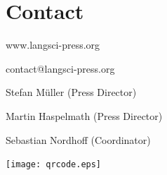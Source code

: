 \documentclass[
notumble,
]{leaflet}
\begin{document}
\section{\sffamily\Large Contact}
\parbox{.7\textwidth}{
{  \sffamily www.langsci-press.org}

{  \sffamily  contact@langsci-press.org}

Stefan M\"uller (Press Director)

Martin Haspelmath (Press Director)

Sebastian Nordhoff (Coordinator)

}
\parbox{.28\textwidth}{
\texttt{[image: qrcode.eps]}
}








% 

 

\loggingall
\end{document}
